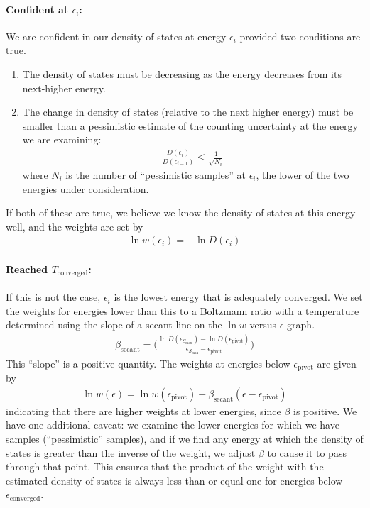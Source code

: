 \documentclass[letterpaper,twocolumn,amsmath,amssymb,pre,aps,10pt]{revtex4-1}
\begin{document}
\paragraph{Confident at $\epsilon_i$:} We are confident in our density
of states at energy $\epsilon_i$ provided two conditions are true.
\begin{enumerate}
\item The density of states must be decreasing as the energy decreases
  from its next-higher energy.
\item The change in density of states (relative to the next higher
  energy) must be smaller than a pessimistic estimate of the counting
  uncertainty at the energy we are examining:
  \begin{align}
    \frac{D(\epsilon_i)}{D(\epsilon_{i-1})} < \frac1{\sqrt{N_i}}
  \end{align}
  where $N_i$ is the number of ``pessimistic
  samples'' at $\epsilon_i$, the lower of the two energies under
  consideration.
\end{enumerate}
If both of these are true, we believe we know the density of states at
this energy well, and the weights are set by
\begin{align}
  \ln w(\epsilon_i) = -\ln{D}(\epsilon_i)
\end{align}
\paragraph{Reached $T_\text{converged}$:}
If this is not the case, $\epsilon_i$ is the lowest energy that is
adequately converged.  We set the weights for energies lower than this
to a Boltzmann ratio with a temperature determined using the slope of
a secant line on the $\ln w$ versus $\epsilon$ graph.
\begin{align}
  \beta_\text{secant} = \bigg(\frac{\ln{D}(\epsilon_{S_{\max}}) - \ln{D}
  (\epsilon_\text{pivot})}{\epsilon_{S_{\max}}-\epsilon_\text{pivot}}\bigg)
\end{align}
This ``slope'' is a positive quantity.  The weights at energies below
$\epsilon_\text{pivot}$ are given by
\begin{align}
  \ln w(\epsilon) = \ln w(\epsilon_\text{pivot}) -
  \beta_\text{secant}(\epsilon - \epsilon_\text{pivot})
\end{align}
indicating that there are higher weights at lower energies, since
$\beta$ is positive.  We have one additional caveat: we examine the
lower energies for which we have samples (``pessimistic'' samples),
and if we find any energy at which the density of states is greater
than the inverse of the weight, we adjust $\beta$ to cause it to pass
through that point.  This ensures that the product of the weight with
the estimated density of states is always less than or equal one for
energies below $\epsilon_\text{converged}$.
\end{document}
